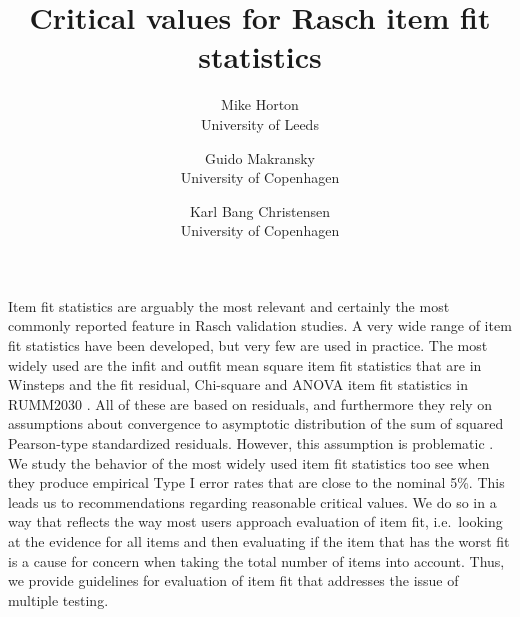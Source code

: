 \documentclass{article}
\begin{document}
\title{Critical values for Rasch item fit statistics}

\author{Mike Horton\\ University of Leeds  \and Guido Makransky\\ University of Copenhagen \and Karl Bang Christensen\\ University of Copenhagen}


\maketitle




Item fit statistics are arguably the most relevant and certainly the most commonly reported feature in Rasch validation studies. A very wide range of item fit statistics have been developed, but very few are used in practice. The most widely used are the infit and outfit mean square item fit statistics \cite{wright-stone,wright-masters} that are in Winsteps \cite{winsteps} and the fit residual, Chi-square and ANOVA item fit statistics in RUMM2030 \cite{RUMM}. All of these are based on residuals, and furthermore they rely on assumptions about convergence to asymptotic distribution of the sum of squared Pearson-type standardized residuals. However, this assumption is problematic \cite{jennings1986}. We study the behavior of the most widely used item fit statistics too see when they produce empirical Type I error rates that are close to the nominal 5\%. This leads us to recommendations regarding reasonable critical values. We do so in a way that reflects the way most users approach evaluation of item fit, i.e.\ looking at the evidence for all items and then evaluating if the item that has the worst fit is a cause for concern when taking the total number of items into account. Thus, we provide guidelines for evaluation of item fit that addresses the issue of multiple testing. 




\end{document}
